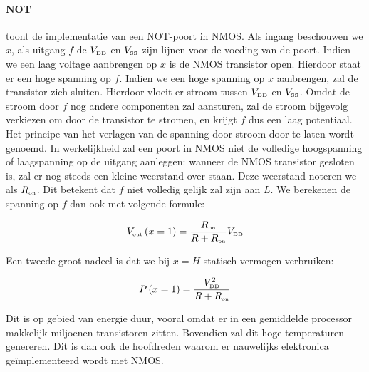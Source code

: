 \paragraph{NOT}
 toont de implementatie van een NOT-poort in NMOS. Als ingang beschouwen we $x$, als uitgang $f$ de $V_{\mbox{\tiny DD}}$ en $V_{\mbox{\tiny SS}}$ zijn lijnen voor de voeding van de poort. Indien we een laag voltage aanbrengen op $x$ is de NMOS transistor open. Hierdoor staat er een hoge spanning op $f$. Indien we een hoge spanning op $x$ aanbrengen, zal de transistor zich sluiten. Hierdoor vloeit er stroom tussen $V_{\mbox{\tiny DD}}$ en $V_{\mbox{\tiny SS}}$. Omdat de stroom door $f$ nog andere componenten zal aansturen, zal de stroom bijgevolg verkiezen om door de transistor te stromen, en krijgt $f$ dus een laag potentiaal. Het principe van het verlagen van de spanning door stroom door te laten wordt  genoemd. In werkelijkheid zal een poort in NMOS niet de volledige hoogspanning of laagspanning op de uitgang aanleggen: wanneer de NMOS transistor gesloten is, zal er nog steeds een kleine weerstand over staan. Deze weerstand noteren we als $R_{\mbox{\tiny on}}$. Dit betekent dat $f$ niet volledig gelijk zal zijn aan $L$. We berekenen de spanning op $f$ dan ook met volgende formule:

\begin{equation}
V_{\mbox{\tiny out}}\left(x=1\right)=\displaystyle\frac{R_{\mbox{\tiny on}}}{R+R_{\mbox{\tiny on}}}V_{\mbox{\tiny DD}}
\end{equation}

Een tweede groot nadeel is dat we bij $x=H$ statisch vermogen verbruiken:

\begin{equation}
P\left(x=1\right)=\displaystyle\frac{V_{\mbox{\tiny DD}}^2}{R+R_{\mbox{\tiny on}}}
\end{equation}

Dit is op gebied van energie duur, vooral omdat er in een gemiddelde processor makkelijk miljoenen transistoren zitten. Bovendien zal dit hoge temperaturen genereren. Dit is dan ook de hoofdreden waarom er nauwelijks elektronica ge\"implementeerd wordt met NMOS.

